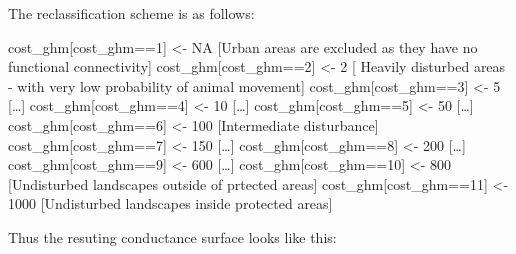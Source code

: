 \documentclass[
]{book}
\begin{document}
The reclassification scheme is as follows:

cost\_ghm{[}cost\_ghm==1{]} \textless- NA {[}Urban areas are excluded as they have no functional connectivity{]}
cost\_ghm{[}cost\_ghm==2{]} \textless- 2 {[} Heavily disturbed areas - with very low probability of animal movement{]}
cost\_ghm{[}cost\_ghm==3{]} \textless- 5 {[}\ldots{]}
cost\_ghm{[}cost\_ghm==4{]} \textless- 10 {[}\ldots{]}
cost\_ghm{[}cost\_ghm==5{]} \textless- 50 {[}\ldots{]}
cost\_ghm{[}cost\_ghm==6{]} \textless- 100 {[}Intermediate disturbance{]}
cost\_ghm{[}cost\_ghm==7{]} \textless- 150 {[}\ldots{]}
cost\_ghm{[}cost\_ghm==8{]} \textless- 200 {[}\ldots{]}
cost\_ghm{[}cost\_ghm==9{]} \textless- 600 {[}\ldots{]}
cost\_ghm{[}cost\_ghm==10{]} \textless- 800 {[}Undisturbed landscapes outside of prtected areas{]}
cost\_ghm{[}cost\_ghm==11{]} \textless- 1000 {[}Undisturbed landscapes inside protected areas{]}

Thus the resuting conductance surface looks like this:
\end{document}
